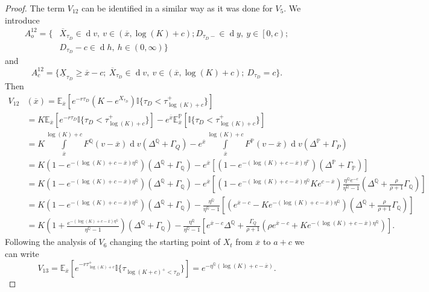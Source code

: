 \documentclass[10pt]{amsart}
\def\E{{\mathbb{E}}}
\def\P{{\mathbb{P}}}
\def\Q{{\mathbb{Q}}}
\def \R{{{\rm I{\!}\rm R}}}
\def \I{{\mathbb{I}}}
\newcommand{\dx}{\operatorname{d}\!}
\def\P{{\mathbb P}} \def\le{\left} \def\ri{\right} \def\i{\infty}
\def\E{{\mathbb E}} \def\PP{\mc P} \def\Z{{\mathbb Z}} \def\R{{\mathbb R}}
\begin{document}
\begin{proof}
			The term $V_{12}$ can be identified in a similar way as it was done for $V_5$. We introduce
			\begin{align*}
				A_o^{12} = \{& \overline{X}_{\tau_D} \in \dx v,\ v \in (\overline{x}, \log(K)+c); D_{\tau_D-} \in \dx y,\ y \in \left[ 0,c \right); \\ \nonumber & D_{\tau_D} - c \in \dx h,\ h \in (0, \infty)
				\}
			\end{align*}
			and
			\begin{equation*}
				A_c^{12} = \{ \underline{X}_{\tau_D} \geq \overline{x}-c;\ \overline{X}_{\tau_D} \in \dx v,\ v \in (\overline{x},\log(K)+c);\  D_{\tau_D} =c \}.
			\end{equation*}
			Then
			\begin{align}
				\nonumber V_{12}&(\overline{x}) = \E_{\overline{x}}\left[ e^{-r\tau_D} \left( K - e^{X_{\tau_D}} \right) \I
				\{ \tau_D < \tau_{\log(K)+c}^+ \} \right] \\
				\nonumber & = K\E_{\overline{x}}\left[ e^{-r\tau_D} \I
				\{ \tau_D < \tau_{\log(K)+c}^+ \} \right] - e^{\overline{x}}\E^\P_{\overline{x}}\left[  \I
				\{ \tau_D < \tau_{\log(K)+c}^+ \} \right] \\
				\nonumber & = K\int\limits^{\log(K)+c}_{\overline{x}}F^\Q(v-\overline{x})\dx v \left( \Delta^\Q + \Gamma_Q \right)
				- e^{\overline{x}} \int\limits^{\log(K)+c}_{\overline{x}}F^\P(v-\overline{x})\dx v \left( \Delta^\P + \Gamma_P \right)
				\\
				\nonumber & = K \left(1 - e^{-(\log(K)+c-\overline{x})\eta^\Q}\right)\left( \Delta^\Q + \Gamma_\Q \right)   - e^{\overline{x}}\left[ \left(1 - e^{-(\log(K)+c-\overline{x})\eta^\P}\right)\left( \Delta^\P + \Gamma_\P \right)  \right]
				\\
				\nonumber & = K \left(1 - e^{-(\log(K)+c-\overline{x})\eta^\Q}\right)\left( \Delta^\Q + \Gamma_\Q \right)   - e^{\overline{x}}\left[ \left(1 - e^{-(\log(K)+c-\overline{x})\eta^\Q} Ke^{c-\overline{x}} \right)\frac{\eta^\Q e^{-c}}{\eta^\Q-1}\left( \Delta^\Q + \frac{\rho}{\rho+1}\Gamma_\Q \right)  \right]
				\\
				\nonumber & = K \left(1 - e^{-(\log(K)+c-\overline{x})\eta^\Q}\right)\left( \Delta^\Q + \Gamma_\Q \right)   - \frac{\eta^\Q}{\eta^\Q-1}\left[ \left(e^{\overline{x}-c} - Ke^{-(\log(K)+c-\overline{x})\eta^\Q}  \right)\left( \Delta^\Q + \frac{\rho}{\rho+1}\Gamma_\Q \right)  \right]
				\\
				& = K \left(1 + \frac{e^{-(\log(K)+c-\overline{x})\eta^\Q}}{\eta^\Q-1}\right)\left( \Delta^\Q + \Gamma_\Q \right)   - \frac{\eta^\Q}{\eta^\Q-1}\left[ e^{\overline{x}-c}\Delta^\Q + \frac{\Gamma_Q}{\rho+1}\left( \rho e^{\overline{x}-c} +  Ke^{-(\log(K)+c-\overline{x})\eta^\Q} \right)  \right]. \label{V12}
			\end{align}
			Following the analysis of $V_6$ changing the starting point of $X_t$ from $\overline{x}$ to $a+c$ we can write
			\begin{equation}\label{V13}
				V_{13} = \E_{\overline{x}}\left[ e^{-r\tau_{\log(K)+c}^+} \I
				\{ \tau_{\log(K+c)^+ < \tau_D} \} \right] = e^{-\eta^\Q (\log(K) + c - \overline{x})}.
			\end{equation}
			

\end{proof}
\end{document}
